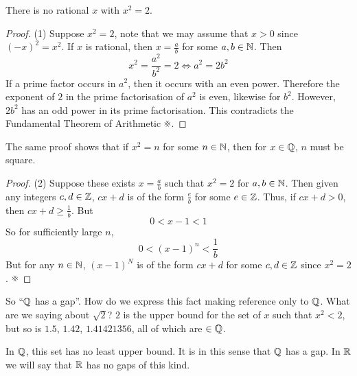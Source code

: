 \documentclass{article}
\begin{document}
\begin{nprop}
    There is no rational $x$ with $x^2 = 2$.
\end{nprop}
\begin{proof} (1) 
    Suppose $x^2 = 2$, note that we may assume that $x > 0$ since $(-x)^2 = x^2$.
    If $x$ is rational, then $x = \frac{a}{b}$ for some $a, b \in \mathbb{N}$.
    Then
    \[
        x^2 = \frac{a^2}{b^2} = 2 \Leftrightarrow a^2 = 2 b^2  
    \]
    If a prime factor occurs in $a^2$, then it occurs with an even power.
    Therefore the exponent of $2$ in the prime factorisation of $a^2$ is even, likewise for $b^2$.
    However, $2b^2$ has an odd power in its prime factorisation.
    This contradicts the Fundamental Theorem of Arithmetic $\contradiction$.
\end{proof}
\begin{remark}
    The same proof shows that if $x^2 = n$ for some $n \in \mathbb{N}$, then for $x \in \mathbb{Q}$, $n$ must be square.
\end{remark}

\begin{proof} (2)
    Suppose these exists $x = \frac{a}{b}$ such that $x^2 = 2$ for $a, b \in \mathbb{N}$.
    Then given any integers $c, d \in \mathbb{Z}$, $cx + d$ is of the form $\frac{e}{b}$ for some $e \in \mathbb{Z}$.
    Thus, if $cx + d > 0$, then $cx + d \geq \frac{1}{b}$.
    But 
    \[
        0 < x - 1 < 1  
    \]
    So for sufficiently large $n$,
    \[
        0 < (x - 1)^n < \frac{1}{b}  
    \]
    But for any $n \in \mathbb{N}$, $(x - 1)^N$ is of the form $cx + d$ for some $c, d \in \mathbb{Z}$ since $x^2 = 2$. $\contradiction$ 
\end{proof}

So ``$\mathbb{Q}$ has a gap''. How do we express this fact making reference only to $\mathbb{Q}$.
What are we saying about $\sqrt{2}$? $2$ is the upper bound for the set of $x$ such that $x^2 < 2$,
but so is $1.5$, $1.42$, $1.41421356$, all of which are $\in \mathbb{Q}$.

\begin{remark}
    In $\mathbb{Q}$, this set has no least upper bound.
    It is in this sense that $\mathbb{Q}$ has a gap.
    In $\mathbb{R}$ we will say that $\mathbb{R}$ has no gaps of this kind.
\end{remark}
\end{document}
